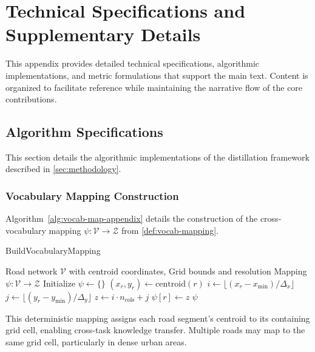 \appendix
\section{Technical Specifications and Supplementary Details}
\label{sec:appendix}

This appendix provides detailed technical specifications, algorithmic implementations, and metric formulations that support the main text. Content is organized to facilitate reference while maintaining the narrative flow of the core contributions.

\subsection{Algorithm Specifications}
\label{app:algorithms}

This section details the algorithmic implementations of the distillation framework described in \autoref{sec:methodology}.

\subsubsection{Vocabulary Mapping Construction}
\label{app:vocab-mapping-alg}

Algorithm~\ref{alg:vocab-map-appendix} details the construction of the cross-vocabulary mapping $\psi: \mathcal{V} \to \mathcal{Z}$ from \autoref{def:vocab-mapping}.

\begin{algorithm}[H]
    \caption{BuildVocabularyMapping}
    \label{alg:vocab-map-appendix}
    \begin{algorithmic}
        \Require Road network $\mathcal{V}$ with centroid coordinates, Grid bounds and resolution
        \Ensure Mapping $\psi: \mathcal{V} \rightarrow \mathcal{Z}$
        \State Initialize $\psi \gets \{\}$
        \State $(x_r, y_r) \gets \text{centroid}(r)$
        \State $i \gets \lfloor (x_r - x_{\min}) / \Delta_x \rfloor$ 
        \State $j \gets \lfloor (y_r - y_{\min}) / \Delta_y \rfloor$ 
        \State $z \gets i \cdot n_{\text{cols}} + j$ 
        \State $\psi[r] \gets z$
        \EndFor
        \State \Return $\psi$
    \end{algorithmic}
\end{algorithm}

This deterministic mapping assigns each road segment's centroid to its containing grid cell, enabling cross-task knowledge transfer. Multiple roads may map to the same grid cell, particularly in dense urban areas.

